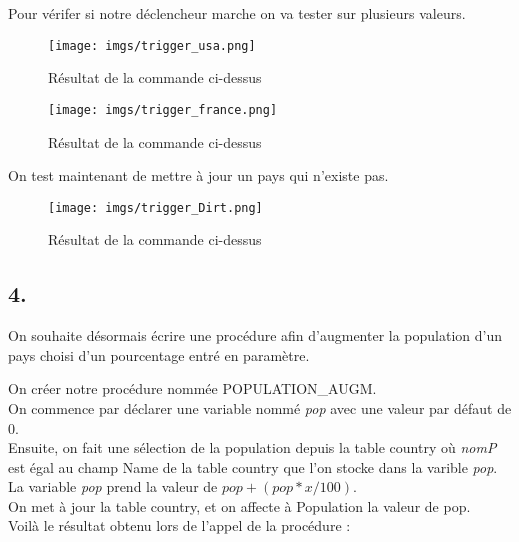 \documentclass[11pt,a4paper]{article}
\begin{document}
Pour vérifer si notre déclencheur marche on va tester sur plusieurs valeurs.



\begin{figure}[h]
	\centering
	\texttt{[image: imgs/trigger\_usa.png]}
	\caption{Résultat de la commande ci-dessus}
	\label{fig8}
\end{figure}



\begin{figure}[h]
	\centering
	\texttt{[image: imgs/trigger\_france.png]}
	\caption{Résultat de la commande ci-dessus}
	\label{fig9}
\end{figure}

On test maintenant de mettre à jour un pays qui n'existe pas.



\begin{figure}[ht]
	\centering
	\texttt{[image: imgs/trigger\_Dirt.png]}
	\caption{Résultat de la commande ci-dessus}
	\label{fig10}
\end{figure}

\newpage

\subsection*{4.}
On souhaite désormais écrire une procédure afin d'augmenter la population d'un pays choisi d'un pourcentage entré en paramètre.



On créer notre procédure nommée POPULATION\_AUGM.\\
On commence par déclarer une variable nommé \emph{pop} avec une valeur par défaut de 0.\\
Ensuite, on fait une sélection de la population depuis la table country où \emph{nomP} est égal au champ Name de la table country que l'on stocke dans la varible \emph{pop}.
La variable \emph{pop} prend la valeur de $pop + (pop * x / 100)$.\\
On met à jour la table country, et on affecte à Population la valeur de pop.\\

Voilà le résultat obtenu lors de l'appel de la procédure :~
\end{document}
